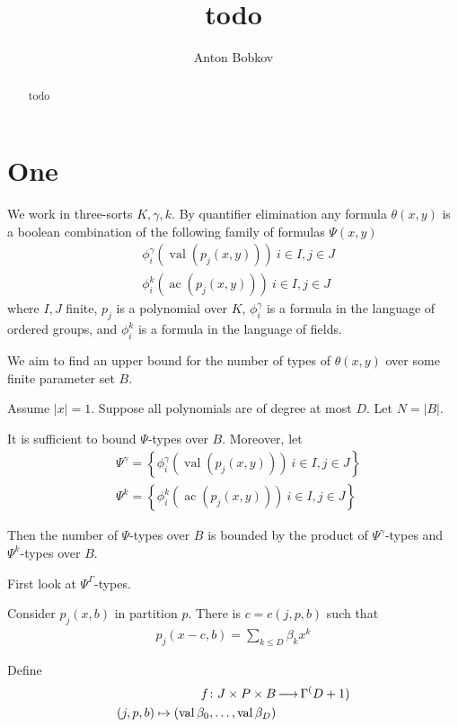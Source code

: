 \documentclass{amsart}
\title{todo}
\author{Anton Bobkov}
\newcommand{\curly}[1]{\left\{#1\right\}}
\DeclareMathOperator{\val}{val}
\DeclareMathOperator{\ac}{ac}
\begin{document}
\begin{abstract}
	todo
\end{abstract}


\maketitle




\section{One}


We work in three-sorts $K, \gamma, k$.
By quantifier elimination any formula $\theta(x,y)$ is a boolean combination of the following family of formulas $\Psi(x, y)$
\begin{align*}
	&\phi_i^\gamma (\val(p_j(x, y))) \ i \in I, j \in J \\
	&\phi_i^k (\ac(p_j(x, y))) \ i \in I, j \in J
\end{align*}
where $I,J$ finite, $p_j$ is a polynomial over $K$,
$\phi_i^\gamma$ is a formula in the language of ordered groups,
and $\phi_i^k$ is a formula in the language of fields.


We aim to find an upper bound for the number of types of $\theta(x, y)$ over some finite parameter set $B$.

Assume $|x| = 1$.
Suppose all polynomials are of degree at most $D$.
Let $N = |B|$.

It is sufficient to bound $\Psi$-types over $B$.
Moreover, let 
\begin{align*}
	&\Psi^\gamma = \curly{ \phi_i^\gamma (\val(p_j(x, y))) \ i \in I, j \in J } \\
	&\Psi^k = \curly{ \phi_i^k (\ac(p_j(x, y))) \ i \in I, j \in J }
\end{align*}

Then the number of $\Psi$-types over $B$ is bounded by the product of $\Psi^\gamma$-types and $\Psi^k$-types over $B$.

First look at $\Psi^\Gamma$-types.

Consider $p_j(x, b)$ in partition $p$.
There is $c = c(j, p, b)$ such that
\begin{align*}
	p_j(x - c, b) = \sum_{k \leq D} \beta_k x^k
\end{align*}

Define
\begin{align*}
	f \colon J \times P \times B &\arr \Gamma^(D+1) \\
	(j, p, b) \mapsto (\val \beta_0, \ldots, \val \beta_D)
\end{align*}
\end{document}
